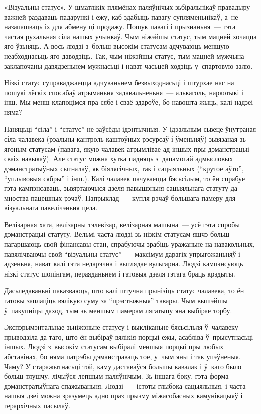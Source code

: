 «Візуальны статус». У шматлікіх плямёнах паляўнічых-зьбіральнікаў правадыру важней раздаваць падарункі і ежу, каб здабыць павагу супляменьнікаў, а~не назапашваць іх для абмену ці продажу. Пошук павагі і прызнаньня~--- гэта частая рухальная сіла нашых учынкаў. Чым ніжэйшы статус, тым мацней хочацца яго ўзьняць. А вось людзі з~больш высокім статусам адчуваюць меншую неабходнасьць яго даводзіць. Так, чым ніжэйшы статус, тым мацней мужчына заклапочаны давядзеньнем мужнасьці і нават часьцей ходзіць у~спартовую залю.

Нізкі статус суправаджаецца адчуваньнем безвыходнасьці і штурхае нас на пошукі лёгкіх спосабаў атрыманьня задавальненьня~--- алькаголь, наркотыкі і інш. Мы менш клапоцімся пра сябе і сваё здароўе, бо навошта жыць, калі надзеі няма?

Паняцьці ``сіла'' і ``статус'' не заўсёды ідэнтычныя. У ідэальным сьвеце ўнутраная сіла чалавека (рэальны кантроль каштоўных рэсурсаў і ўменьняў) зьвязаная зь ягоным статусам (павага, якую чалавек атрымлівае ад іншых пры дэманстрацыі сваіх навыкаў). Але статус можна хутка падняць з~дапамогай адмысловых дэманстратыўных сыгналаў, як біялягічных, так і сацыяльных (``крутое аўто'', ``уплывовыя сябры'' і інш.). Калі чалавек пачуваецца бясьсілым, то ён спрабуе гэта кампэнсаваць, зьвяртаючыся дзеля павышэньня сацыяльнага статуту да мноства пацешных рэчаў. Напрыклад~--- купля рэчаў большага памеру для візуальнага павелічэньня цела.

Велізарная хата, велізарны тэлевізар, велізарная машына~--- усё гэта спробы дэманстрацыі статуту. Вельмі часта людзі зь нізкім статусам яшчэ больш пагаршаюць свой фінансавы стан, спрабуючы зрабіць уражаньне на навакольных, павялічваючы свой ``візуальны статус''~--- максімум дарагіх упрыгожаньняў і адзеньня, нават калі гэта недарэчна і выглядае вульгарна. Людзі кампэнсуюць нізкі статус шопінгам, пераяданьнем і гатовыя дзеля гэтага браць крэдыты.

Дасьледаваньні паказваюць, што калі штучна прынізіць статус чалавека, то ён гатовы заплаціць вялікую суму за ``прэстыжныя'' тавары. Чым вышэйшы ў~пакупніцы даход, тым зь меншым памерам лягатыпу яна выбірае торбу.

Экспэрымэнтальнае зьніжэньне статусу і выкліканьне бясьсільля ў~чалавеку прыводзіла да таго, што ён выбіраў вялікія порцыі ежы, асабліва ў~прысутнасьці іншых. Людзі з~высокім статусам выбіралі меншыя порцыі пры любых абставінах, бо няма патрэбы дэманстраваць тое, у~чым яны і так упэўненыя. Чаму? У старажытнасьці той, каму даставаўся большы кавалак і ў~каго было больш тлушчу, лічыўся лепшым паляўнічым. Зь іншага боку, гэта форма дэманстратыўнага спажываньня. Людзі~--- істоты глыбока сацыяльныя, і часта нашыя дзеі можна зразумець адно праз прызму міжасобасных камунікацыяў і герархічных пасылаў.

